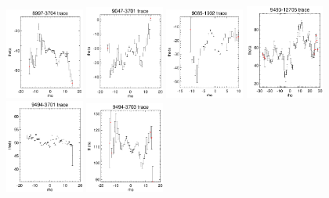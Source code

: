 \documentclass[fleqn,usenatbib]{mnras}
\begin{document}
\begin{figure}
    \includegraphics[width=0.23\textwidth]{Images/SN1-MC250/CPSBs/8997-3704-1-250.png}
    \includegraphics[width=0.23\textwidth]{Images/SN1-MC250/CPSBs/9047-3701-1-250.png}
    \includegraphics[width=0.23\textwidth]{Images/SN1-MC250/CPSBs/9085-1902-1-250.png}
    \includegraphics[width=0.23\textwidth]{Images/SN1-MC250/CPSBs/9493-12705-1-250.png}
    \includegraphics[width=0.23\textwidth]{Images/SN1-MC250/CPSBs/9494-3701-1-250.png}
    \includegraphics[width=0.23\textwidth]{Images/SN1-MC250/CPSBs/9494-3703-1-250.png}

\end{figure}
\end{document}
